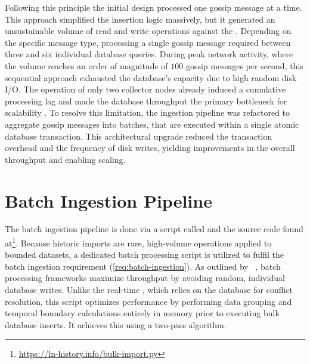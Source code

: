 Following this principle the initial design processed one gossip message at a time.
This approach simplified the insertion logic massively, 
but it generated an unsustainable volume of read and write operations against the .
Depending on the specific message type, processing a single gossip message required between three and six individual database queries.
During peak network activity, where the volume reaches an order of magnitude of $100$ gossip messages per second, 
this sequential approach exhausted the database's capacity due to high random disk I/O.
The operation of only two collector nodes already induced a cumulative processing lag 
and made the database throughput the primary bottleneck for scalability .
To resolve this limitation, the ingestion pipeline was refactored to aggregate gossip messages into batches,
that are executed within a single atomic database transaction.
This architectural upgrade reduced the transaction overhead and the frequency of disk writes, 
yielding improvements in the overall throughput and enabling scaling.


\section{Batch Ingestion Pipeline}
\label{sec:batch-pipeline}
The batch ingestion pipeline is done via a  script called  
and the source code found at\footnote{\url{https://ln-history.info/bulk-import.py}}.
Because historic imports are rare, high-volume operations applied to bounded datasets, 
a dedicated batch processing script is utilized to fulfil the batch ingestion requirement (\ref{req:batch-ingestion}).
As outlined by \citeauthor{kleppmann_designing_2017}~\cite{kleppmann_designing_2017}, 
batch processing frameworks maximize throughput by avoiding random, individual database writes. 
Unlike the real-time , which relies on the database for conflict resolution, 
this script optimizes performance by performing data grouping and temporal boundary calculations 
entirely in memory prior to executing bulk database inserts. It achieves this using a two-pass algorithm.


